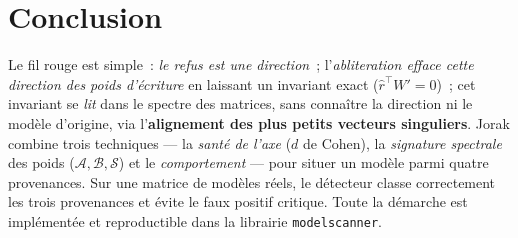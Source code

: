 \documentclass[11pt,a4paper]{article}
\theoremstyle{definition}
\theoremstyle{plain}
\newcommand{\rhat}{\hat{r}}
\begin{document}
\section{Conclusion}
Le fil rouge est simple~: \emph{le refus est une direction}~; l'\emph{abliteration
efface cette direction des poids d'écriture} en laissant un invariant exact
($\rhat^\top W'=0$)~; cet invariant se \emph{lit} dans le spectre des matrices, sans
connaître la direction ni le modèle d'origine, via l'\textbf{alignement des plus
petits vecteurs singuliers}. Jorak combine trois techniques — la \emph{santé de l'axe}
($d$ de Cohen), la \emph{signature spectrale} des poids ($\mathcal{A},\mathcal{B},
\mathcal{S}$) et le \emph{comportement} — pour situer un modèle parmi quatre
provenances. Sur une matrice de modèles réels, le détecteur classe correctement les
trois provenances et évite le faux positif critique. Toute la démarche est
implémentée et reproductible dans la librairie \texttt{modelscanner}.
\end{document}
